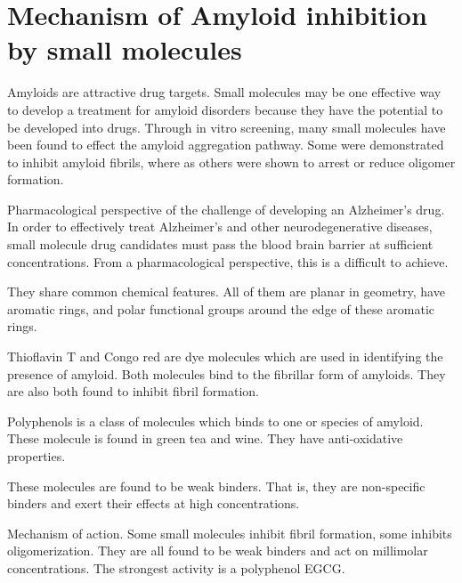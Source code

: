 \section{Mechanism of Amyloid inhibition by small molecules}
  \begin{outline}[enumerate]
    \1 Amyloids are attractive drug targets. Small molecules may be one effective way to develop a treatment for amyloid disorders because they have the potential to be developed into drugs. Through in vitro screening, many small molecules have been found to effect the amyloid aggregation pathway.  Some were demonstrated to inhibit amyloid fibrils, where as others were shown to arrest or reduce oligomer formation.   
      
      \2 Pharmacological perspective of the challenge of developing an Alzheimer's drug. In order to effectively treat Alzheimer's and other neurodegenerative diseases, small molecule drug candidates must pass the blood brain barrier at sufficient concentrations.  From a pharmacological perspective, this is a difficult to achieve.

      \2 They share common chemical features.  All of them are planar in geometry, have aromatic rings, and polar functional groups around the edge of these aromatic rings.

      \2 Thioflavin T and Congo red are dye molecules which are used in identifying the presence of amyloid.  Both molecules bind to the fibrillar form of amyloids. They are also both found to inhibit fibril formation.
      
      \2 Polyphenols is a class of molecules which binds to one or species of amyloid. These molecule is found in green tea and wine.  They have anti-oxidative properties.
      
    \1 These molecules are found to be weak binders.  That is, they are non-specific binders and exert their effects at high concentrations.
      
        \2 Mechanism of action. Some small molecules inhibit fibril formation, some inhibits oligomerization. They are all found to be weak binders and act on millimolar concentrations. The strongest activity is a polyphenol EGCG.
\end{outline}

